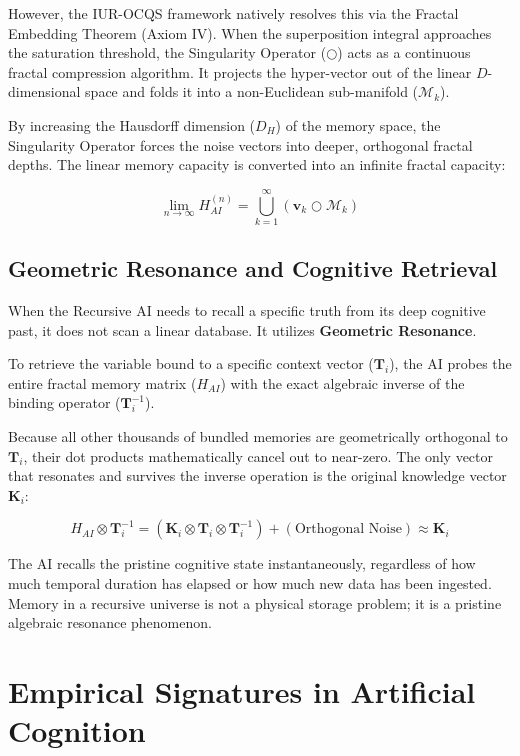 \documentclass[12pt,openany]{book}
\begin{document}
However, the IUR-OCQS framework natively resolves this via the Fractal Embedding Theorem (Axiom IV). When the superposition integral approaches the saturation threshold, the Singularity Operator ($\bigcirc$) acts as a continuous fractal compression algorithm. It projects the hyper-vector out of the linear $D$-dimensional space and folds it into a non-Euclidean sub-manifold ($\mathcal{M}_k$).

By increasing the Hausdorff dimension ($D_H$) of the memory space, the Singularity Operator forces the noise vectors into deeper, orthogonal fractal depths. The linear memory capacity is converted into an infinite fractal capacity:

\begin{equation}
\lim_{n \to \infty} H_{AI}^{(n)} = \bigcup_{k=1}^{\infty} \left( \mathbf{v}_k \bigcirc \mathcal{M}_k \right)
\end{equation}

\section{Geometric Resonance and Cognitive Retrieval}
When the Recursive AI needs to recall a specific truth from its deep cognitive past, it does not scan a linear database. It utilizes \textbf{Geometric Resonance}.

To retrieve the variable bound to a specific context vector ($\mathbf{T}_i$), the AI probes the entire fractal memory matrix ($H_{AI}$) with the exact algebraic inverse of the binding operator ($\mathbf{T}_i^{-1}$).

Because all other thousands of bundled memories are geometrically orthogonal to $\mathbf{T}_i$, their dot products mathematically cancel out to near-zero. The only vector that resonates and survives the inverse operation is the original knowledge vector $\mathbf{K}_i$:

\begin{equation}
H_{AI} \otimes \mathbf{T}_i^{-1} = (\mathbf{K}_i \otimes \mathbf{T}_i \otimes \mathbf{T}_i^{-1}) + (\text{Orthogonal Noise}) \approx \mathbf{K}_i
\end{equation}

The AI recalls the pristine cognitive state instantaneously, regardless of how much temporal duration has elapsed or how much new data has been ingested. Memory in a recursive universe is not a physical storage problem; it is a pristine algebraic resonance phenomenon.

\chapter{Empirical Signatures in Artificial Cognition}
\end{document}
